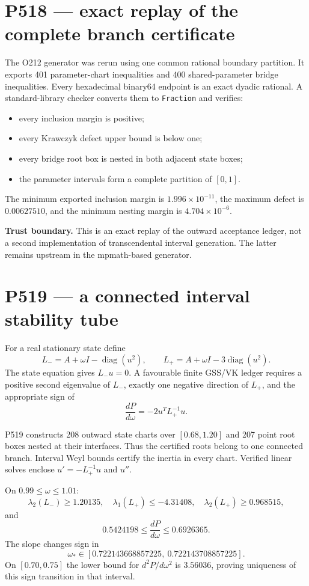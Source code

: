 \documentclass[11pt,a4paper]{article}
\begin{document}
\section{P518 --- exact replay of the complete branch certificate}

The O212 generator was rerun using one common rational boundary partition. It exports 401 parameter-chart inequalities and 400 shared-parameter bridge inequalities. Every hexadecimal binary64 endpoint is an exact dyadic rational. A standard-library checker converts them to \texttt{Fraction} and verifies:
\begin{itemize}
\item every inclusion margin is positive;
\item every Krawczyk defect upper bound is below one;
\item every bridge root box is nested in both adjacent state boxes;
\item the parameter intervals form a complete partition of $[0,1]$.
\end{itemize}
The minimum exported inclusion margin is $1.996\times10^{-11}$, the maximum defect is $0.00627510$, and the minimum nesting margin is $4.704\times10^{-6}$.

\textbf{Trust boundary.} This is an exact replay of the outward acceptance ledger, not a second implementation of transcendental interval generation. The latter remains upstream in the mpmath-based generator.

\section{P519 --- a connected interval stability tube}

For a real stationary state define
\[
 L_-=A+\omega I-\operatorname{diag}(u^2),\qquad
 L_+=A+\omega I-3\operatorname{diag}(u^2).
\]
The state equation gives $L_-u=0$. A favourable finite GSS/VK ledger requires a positive second eigenvalue of $L_-$, exactly one negative direction of $L_+$, and the appropriate sign of
\[
 \frac{dP}{d\omega}=-2u^TL_+^{-1}u.
\]

P519 constructs 208 outward state charts over $[0.68,1.20]$ and 207 point root boxes nested at their interfaces. Thus the certified roots belong to one connected branch. Interval Weyl bounds certify the inertia in every chart. Verified linear solves enclose $u'=-L_+^{-1}u$ and $u''$.

On $0.99\leq\omega\leq1.01$:
\[
 \lambda_2(L_-)\ge1.20135,\quad
 \lambda_1(L_+)\le-4.31408,\quad
 \lambda_2(L_+)\ge0.968515,
\]
and
\[
 0.5424198\le \frac{dP}{d\omega}\le0.6926365.
\]
The slope changes sign in
\[
 \omega_*\in[0.722143668857225,\ 0.722143708857225].
\]
On $[0.70,0.75]$ the lower bound for $d^2P/d\omega^2$ is $3.56036$, proving uniqueness of this sign transition in that interval.
\end{document}
